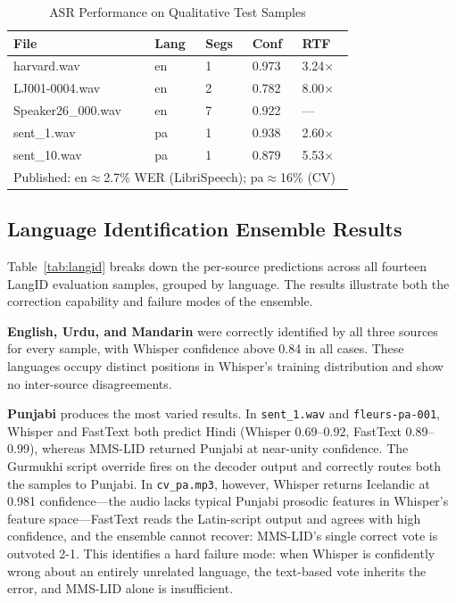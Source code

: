 \documentclass[12pt, onecolumn]{IEEEtran}
\begin{document}
\begin{table}[htbp]
\caption{ASR Performance on Qualitative Test Samples}
\label{tab:asr}
\begin{center}
\begin{tabular}{lllll}
\toprule
\textbf{File} & \textbf{Lang} & \textbf{Segs} & \textbf{Conf} & \textbf{RTF} \\
\midrule
harvard.wav & en & 1 & 0.973 & 3.24$\times$ \\
LJ001-0004.wav & en & 2 & 0.782 & 8.00$\times$ \\
Speaker26\_000.wav & en & 7 & 0.922 & --- \\
sent\_1.wav & pa & 1 & 0.938 & 2.60$\times$ \\
sent\_10.wav & pa & 1 & 0.879 & 5.53$\times$ \\
\midrule
\multicolumn{5}{l}{\footnotesize Published: en$\approx$2.7\% WER (LibriSpeech); pa$\approx$16\% (CV)~\cite{radford2022whisper}} \\
\bottomrule
\end{tabular}
\end{center}
\end{table}

\subsection{Language Identification Ensemble Results}
\label{sec:langid}

Table~\ref{tab:langid} breaks down the per-source predictions across all fourteen LangID evaluation samples, grouped by language. The results illustrate both the correction capability and failure modes of the ensemble.

\textbf{English, Urdu, and Mandarin} were correctly identified by all three sources for every sample, with Whisper confidence above 0.84 in all cases. These languages occupy distinct positions in Whisper's training distribution and show no inter-source disagreements.

\textbf{Punjabi} produces the most varied results. In \texttt{sent\_1.wav} and \texttt{fleurs-pa-001}, Whisper and FastText both predict Hindi (Whisper 0.69--0.92, FastText 0.89--0.99), whereas MMS-LID returned Punjabi at near-unity confidence. The Gurmukhi script override fires on the decoder output and correctly routes both the samples to Punjabi. In \texttt{cv\_pa.mp3}, however, Whisper returns Icelandic at 0.981 confidence---the audio lacks typical Punjabi prosodic features in Whisper's feature space---FastText reads the Latin-script output and agrees with high confidence, and the ensemble cannot recover: MMS-LID's single correct vote is outvoted 2-1. This identifies a hard failure mode: when Whisper is confidently wrong about an entirely unrelated language, the text-based vote inherits the error, and MMS-LID alone is insufficient.
\end{document}
